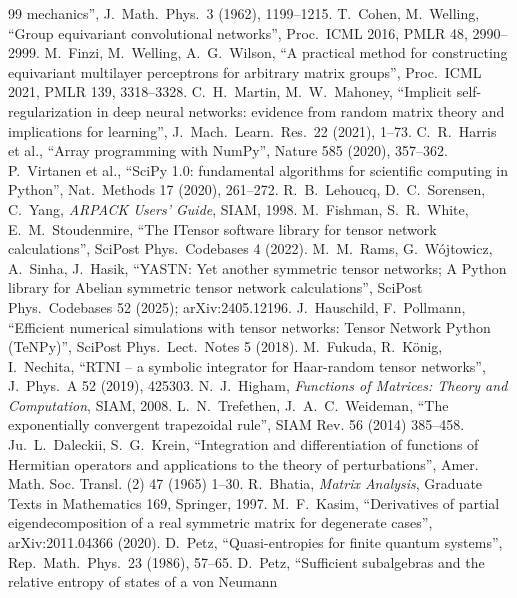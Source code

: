 \documentclass[11pt]{article}
\begin{document}
{\begin{thebibliography}{99}
  mechanics'', J.\ Math.\ Phys.\ 3 (1962), 1199--1215.
 T.~Cohen, M.~Welling, ``Group equivariant convolutional networks'', Proc.\ ICML 2016, PMLR 48,
  2990--2999.
 M.~Finzi, M.~Welling, A.~G.~Wilson, ``A practical method for constructing equivariant multilayer
  perceptrons for arbitrary matrix groups'', Proc.\ ICML 2021, PMLR 139, 3318--3328.
 C.~H.~Martin, M.~W.~Mahoney, ``Implicit self-regularization in deep neural networks: evidence from
  random matrix theory and implications for learning'', J.\ Mach.\ Learn.\ Res.\ 22 (2021), 1--73.
 C.~R.~Harris et al., ``Array programming with NumPy'', Nature 585 (2020), 357--362.
 P.~Virtanen et al., ``SciPy 1.0: fundamental algorithms for scientific computing in Python'',
  Nat.\ Methods 17 (2020), 261--272.
 R.~B.~Lehoucq, D.~C.~Sorensen, C.~Yang, \emph{ARPACK Users' Guide}, SIAM, 1998.
 M.~Fishman, S.~R.~White, E.~M.~Stoudenmire, ``The ITensor software library for tensor network
  calculations'', SciPost Phys.\ Codebases 4 (2022).
 M.~M.~Rams, G.~W\'ojtowicz, A.~Sinha, J.~Hasik, ``YASTN: Yet another symmetric tensor networks; A
  Python library for Abelian symmetric tensor network calculations'', SciPost Phys.\ Codebases 52 (2025);
  arXiv:2405.12196.
 J.~Hauschild, F.~Pollmann, ``Efficient numerical simulations with tensor networks: Tensor
  Network Python (TeNPy)'', SciPost Phys.\ Lect.\ Notes 5 (2018).
 M.~Fukuda, R.~K\"onig, I.~Nechita, ``RTNI -- a symbolic integrator for Haar-random tensor
  networks'', J.\ Phys.\ A 52 (2019), 425303.
 N.~J.~Higham, \emph{Functions of Matrices: Theory and Computation}, SIAM, 2008.
 L.~N.~Trefethen, J.~A.~C.~Weideman, ``The exponentially convergent trapezoidal rule'',
SIAM Rev. 56 (2014) 385--458.
 Ju.~L.~Daleckii, S.~G.~Krein, ``Integration and differentiation of functions of Hermitian
operators and applications to the theory of perturbations'', Amer. Math. Soc. Transl. (2) 47 (1965) 1--30.
 R.~Bhatia, \emph{Matrix Analysis}, Graduate Texts in Mathematics 169, Springer, 1997.
 M.~F.~Kasim, ``Derivatives of partial eigendecomposition of a real symmetric matrix for
degenerate cases'', arXiv:2011.04366 (2020).
 D.~Petz, ``Quasi-entropies for finite quantum systems'', Rep.\ Math.\ Phys.\ 23 (1986), 57--65.
 D.~Petz, ``Sufficient subalgebras and the relative entropy of states of a von Neumann

\end{thebibliography}}
\end{document}
